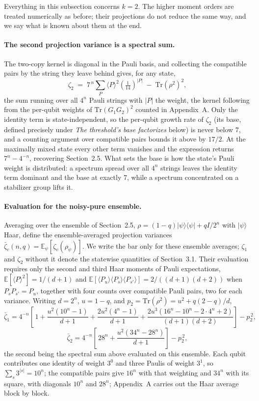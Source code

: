 \documentclass[a4paper,superscriptaddress,nofootinbib,onecolumn,nopdfoutputerror]{quantumarticle}
\begin{document}
Everything in this subsection concerns \(k = 2\). The higher moment
orders are treated numerically as before; their projections do not
reduce the same way, and we say what is known about them at the end.

\paragraph{The second projection variance is a spectral sum.}
The two-copy kernel is diagonal in the Pauli basis, and collecting the
compatible pairs by the string they leave behind gives, for any state,
\[
\zeta_2 \;=\; 7^{\,n}\sum_{P} \langle P\rangle^2 \left(\tfrac{1}{14}\right)^{\!|P|}
\;-\; \mathrm{Tr}(\rho^2)^2 ,
\]
the sum running over all \(4^n\) Pauli strings with \(|P|\) the weight, the
kernel following from the per-qubit weights of \(\mathrm{Tr}(G_1 G_2)^2\)
counted in Appendix~A. Only the identity term is state-independent, so the per-qubit growth rate of \(\zeta_2\)
(its base, defined precisely under \emph{The threshold's base factorizes} below) is never
below \(7\), and a counting argument
over compatible pairs bounds it above by \(17/2\). At the maximally mixed state every other
term vanishes and the expression returns \(7^n - 4^{-n}\), recovering
Section~2.5. What sets the base is how the state's Pauli weight is
distributed: a spectrum spread over all \(4^n\) strings leaves the
identity term dominant and the base at exactly \(7\), while a spectrum
concentrated on a stabilizer group lifts it.

\paragraph{Evaluation for the noisy-pure ensemble.}
Averaging over the ensemble of Section~2.5,
\(\rho = (1-q)|\psi\rangle\langle\psi| + q I/2^n\) with \(|\psi\rangle\)
Haar, define the ensemble-averaged projection variances
\(\bar\zeta_c(n,q) = \mathbb{E}_\psi[\zeta_c(\rho_\psi)]\). We write the bar
only for these ensemble averages; \(\zeta_1\) and \(\zeta_2\) without it
denote the statewise quantities of Section~3.1. Their
evaluation requires only the second and third Haar moments of Pauli
expectations, \(\mathbb{E}[\langle P\rangle^2] = 1/(d+1)\) and
\(\mathbb{E}[\langle P_u\rangle\langle P_s\rangle\langle P_{s'}\rangle]
= 2/((d+1)(d+2))\) when \(P_sP_{s'} = P_u\), together with four counts
over compatible Pauli pairs, two for each variance. Writing \(d = 2^n\), \(u = 1-q\), and
\(p_2 = \mathrm{Tr}(\rho^2) = u^2 + q(2-q)/d\),
\[
\bar\zeta_1 = 4^{-n}\!\left[\,1
+ \frac{u^2(10^n-1)}{d+1}
+ \frac{2u^2(4^n-1)}{d+1}
+ \frac{2u^3\!\left(16^n - 10^n - 2\cdot 4^n + 2\right)}{(d+1)(d+2)}
\right] - p_2^{\,2},
\]
\[
\bar\zeta_2 = 4^{-n}\!\left[\,28^n + \frac{u^2\!\left(34^n - 28^n\right)}{d+1}\right] - p_2^{\,2},
\]
the second being the spectral sum above evaluated on this ensemble.
Each qubit contributes one identity of weight \(3^0\) and three Paulis of
weight \(3^1\), so \(\sum_s 3^{|s|} = 10^n\); the compatible pairs give
\(16^n\) with that weighting and \(34^n\) with its square, with diagonals \(10^n\) and \(28^n\); Appendix~A carries out the Haar average block by
block.
\end{document}

